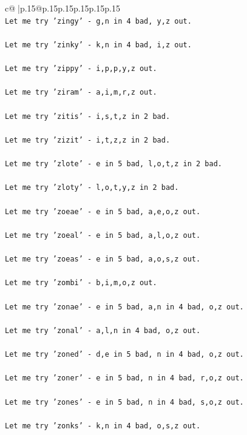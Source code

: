 \documentclass{article}
\begin{document}
{\begin{supertabular}{c@{$\;$}|p{.15\linewidth}@{}p{.15\linewidth}p{.15\linewidth}p{.15\linewidth}p{.15\linewidth}p{.15\linewidth}}
{{{\\ 
\texttt{Let me try 'zingy' {-} g,n in 4 bad, y,z out. } \\
\\ 
\texttt{Let me try 'zinky' {-} k,n in 4 bad, i,z out. } \\
\\ 
\texttt{Let me try 'zippy' {-} i,p,p,y,z out. } \\
\\ 
\texttt{Let me try 'ziram' {-} a,i,m,r,z out. } \\
\\ 
\texttt{Let me try 'zitis' {-} i,s,t,z in 2 bad. } \\
\\ 
\texttt{Let me try 'zizit' {-} i,t,z,z in 2 bad. } \\
\\ 
\texttt{Let me try 'zlote' {-} e in 5 bad, l,o,t,z in 2 bad. } \\
\\ 
\texttt{Let me try 'zloty' {-} l,o,t,y,z in 2 bad. } \\
\\ 
\texttt{Let me try 'zoeae' {-} e in 5 bad, a,e,o,z out. } \\
\\ 
\texttt{Let me try 'zoeal' {-} e in 5 bad, a,l,o,z out. } \\
\\ 
\texttt{Let me try 'zoeas' {-} e in 5 bad, a,o,s,z out. } \\
\\ 
\texttt{Let me try 'zombi' {-} b,i,m,o,z out. } \\
\\ 
\texttt{Let me try 'zonae' {-} e in 5 bad, a,n in 4 bad, o,z out. } \\
\\ 
\texttt{Let me try 'zonal' {-} a,l,n in 4 bad, o,z out. } \\
\\ 
\texttt{Let me try 'zoned' {-} d,e in 5 bad, n in 4 bad, o,z out. } \\
\\ 
\texttt{Let me try 'zoner' {-} e in 5 bad, n in 4 bad, r,o,z out. } \\
\\ 
\texttt{Let me try 'zones' {-} e in 5 bad, n in 4 bad, s,o,z out. } \\
\\ 
\texttt{Let me try 'zonks' {-} k,n in 4 bad, o,s,z out. } \\
}}}
\end{supertabular}}
\end{document}
